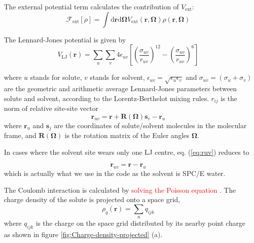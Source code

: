 The external potential term calculates the contribution of $V_{\mathrm{ext}}$:
\begin{equation}
\mathcal{F}_{\mathrm{ext}}[\rho]=\int\mathrm{d}\mathbf{r}\mathrm{d}\mathbf{\mathbf{\Omega}}V_{\mathrm{ext}}(\mathbf{r},\mathbf{\mathbf{\mathbf{\mathbf{\Omega}}}})\rho(\mathbf{r},\mathbf{\mathbf{\mathbf{\mathbf{\Omega}}}})
\end{equation}

The Lennard-Jones potential is given by
\begin{equation}
V_{\mathrm{LJ}}(\mathbf{r})=\sum_{u}\sum_{v}4\epsilon_{uv}\left[\left(\dfrac{\sigma_{uv}}{r_{uv}}\right)^{12}-\left(\dfrac{\sigma_{uv}}{r_{uv}}\right)^{6}\right]\label{eq:LJ}
\end{equation}

where $u$ stands for solute, $v$ stands for solvent, $\epsilon_{uv}=\sqrt{\epsilon_{u}\epsilon_{v}}$
and $\sigma_{uv}=\left(\sigma_{u}+\sigma_{v}\right)$ are the geometric
and arithmetic average Lennard-Jones parameters between solute and
solvent, according to the Lorentz-Berthelot mixing rules. $r_{ij}$
is the norm of relative site-site vector
\begin{equation}
\mathbf{r}_{uv}=\mathbf{r}+\mathbf{R}(\mathbf{\Omega})\mathbf{s}_{v}-\mathbf{r}_{u}\label{eq:ruv}
\end{equation}
where $\mathbf{r}_{u}$ and $\mathbf{s}_{j}$ are the coordinates
of solute/solvent molecules in the molecular frame, and $\mathbf{R}(\mathbf{\Omega})$
is the rotation matrix of the Euler angles $\mathbf{\Omega}$.

In cases where the solvent site wears only one LJ centre, eq. (\ref{eq:ruv})
reduces to

\begin{equation}
\mathbf{r}_{uv}=\mathbf{r}-\mathbf{r}_{u}
\end{equation}
which is actually what we use in the code as the solvent is SPC/E
water.

The Coulomb interaction is calculated by \textcolor{red}{solving the
Poisson equation \citep{Marchi_2001}.} The charge density of the
solute is projected onto a space grid,
\begin{equation}
\rho_{q}(\mathbf{r})=\sum_{u}q_{ijk}
\end{equation}
where $q_{ijk}$ is the charge on the space grid distributed by its
nearby point charge as shown in figure \ref{fig:Charge-density-projected}
(a).


